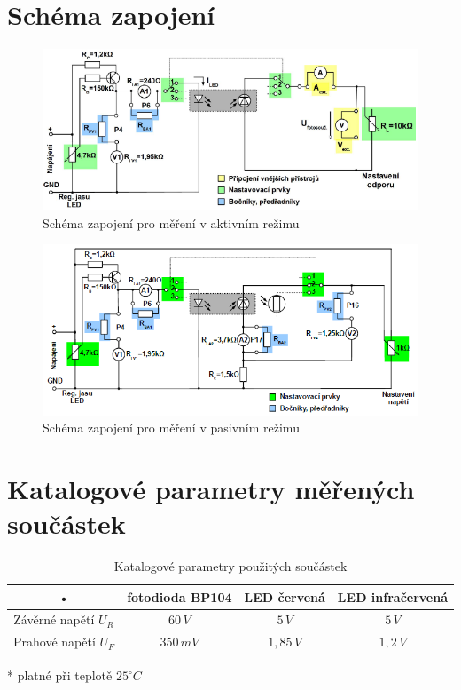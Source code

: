 \documentclass[12pt]{article} %
\begin{document}
\section{Schéma zapojení}
\begin{figure}[H]
\includegraphics[scale=0.8]{schema.png}
\caption{Schéma zapojení pro měření v aktivním režimu}
\end{figure}
\begin{figure}[H]
\includegraphics[scale=0.8]{schema2.png}
\caption{Schéma zapojení pro měření v pasivním režimu}
\end{figure}

\section{Katalogové parametry měřených součástek}
\begin{table}[H]
\caption{Katalogové parametry použitých součástek}
\begin{tabular}{|c|c|c|c|}
\hline 
• & fotodioda BP104 & LED červená & LED infračervená \\
\hline 
Závěrné napětí $U_R$ & $60\,V$ & $5\,V$ & $5\,V$ \\ 
\hline 
Prahové napětí $U_F$ & $350\,mV$ & $1,85\,V$ & $1,2\,V$ \\
\hline 
\end{tabular} 
\end{table}
* platné při teplotě $25^{\circ}C$
\end{document}
